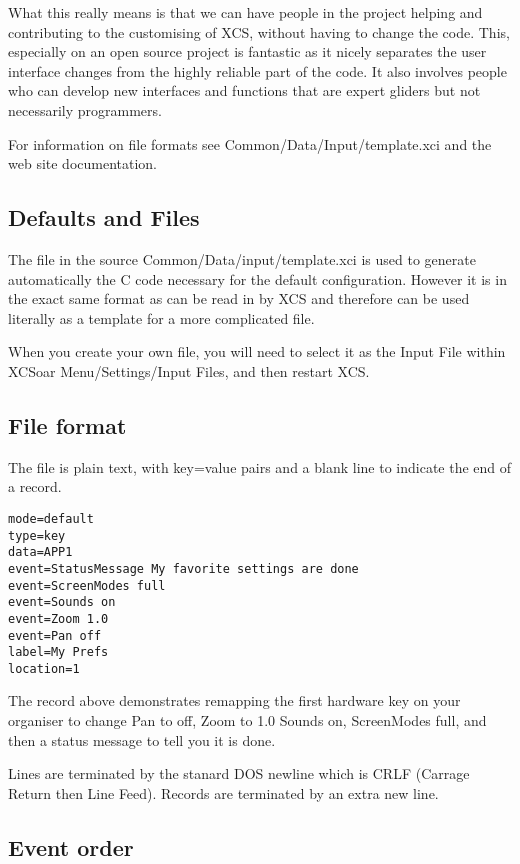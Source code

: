 What this really means is that we can have people in the project
helping and contributing to the customising of XCS, without having to
change the code. This, especially on an open source project is
fantastic as it nicely separates the user interface changes from the
highly reliable part of the code. It also involves people who can
develop new interfaces and functions that are expert gliders but not
necessarily programmers.

For information on file formats see Common/Data/Input/template.xci and
the web site documentation.


\subsection{Defaults and Files}

The file in the source Common/Data/input/template.xci is used to generate
automatically the C code necessary for the default configuration. However it is
in the exact same format as can be read in by XCS and therefore can be used
literally as a template for a more complicated file.

When you create your own file, you will need to select it as the Input File
within XCSoar Menu/Settings/Input Files, and then restart XCS.


\subsection{File format}

The file is plain text, with key=value pairs and a blank line to indicate
the end of a record.

\begin{verbatim}
mode=default
type=key
data=APP1
event=StatusMessage My favorite settings are done
event=ScreenModes full
event=Sounds on
event=Zoom 1.0
event=Pan off
label=My Prefs
location=1
\end{verbatim}

The record above demonstrates remapping the first hardware key on your
organiser to change Pan to off, Zoom to 1.0 Sounds on, ScreenModes
full, and then a status message to tell you it is done.

Lines are terminated by the stanard DOS newline which is CRLF (Carrage
Return then Line Feed). Records are terminated by an extra new line.

\subsection{Event order}

